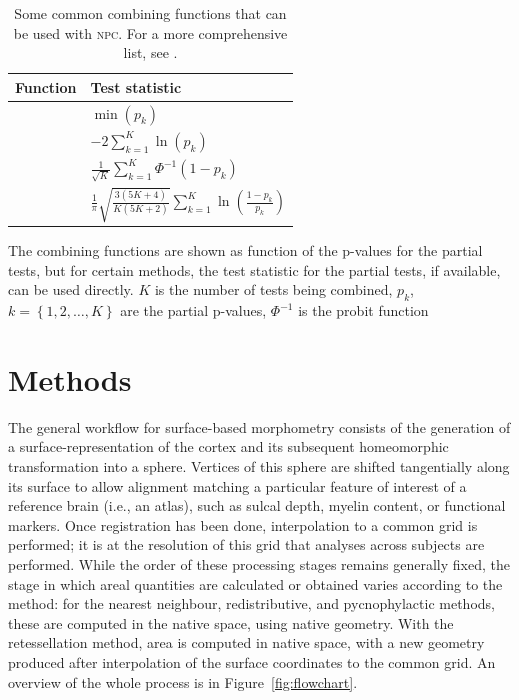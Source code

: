 \begin{table}[!tp]
\caption[Some combining functions that can be used with \textsc{npc}.]{Some common combining functions that can be used with \textsc{npc}. For a more comprehensive list, see \citet{Winkler2016_npc}.}
\begin{center}
\hspace*{-0mm}\begin{tabular}{@{}ll@{}}
\toprule
Function & Test statistic\\
\midrule
\citet{Tippett1931} & $\min \left(p_{k}\right)$ \\[6pt]
\citet{Fisher1932} & $-2 \sum_{k=1}^{K} \ln\left(p_{k}\right)$ \\[6pt]
\citet{Stouffer1949} & $\frac{1}{\sqrt{K}} \sum_{k=1}^{K} \Phi^{-1}\left(1-p_{k}\right)$ \\[6pt]
\citet{Mudholkar1979} & $\frac{1}{\pi}\sqrt{\frac{3(5K+4)}{K(5K+2)}}\sum_{k=1}^{K} \ln\left(\frac{1-p_{k}}{p_{k}}\right)$\\[3pt]
\bottomrule   
\end{tabular}
\end{center}
{\footnotesize
The combining functions are shown as function of the p-values for the partial tests, but for certain methods, the test statistic for the partial tests, if available, can be used directly.
$K$ is the number of tests being combined,
$p_{k}$, $k=\left\{1,2,\ldots,K\right\}$ are the partial p-values,
$\Phi^{-1}$ is the probit function\par}
\label{tab:combining_functions}
\end{table}

\section{Methods}
\label{sec:cortex:methods}

The general workflow for surface-based morphometry consists of the generation of a surface-representation of the cortex and its subsequent homeomorphic transformation into a sphere. Vertices of this sphere are shifted tangentially along its surface to allow alignment matching a particular feature of interest of a reference brain (i.e., an atlas), such as sulcal depth, myelin content, or functional markers. Once registration has been done, interpolation to a common grid is performed; it is at the resolution of this grid that analyses across subjects are performed. While the order of these processing stages remains generally fixed, the stage in which areal quantities are calculated or obtained varies according to the method: for the nearest neighbour, redistributive, and pycnophylactic methods, these are computed in the native space, using native geometry. With the retessellation method, area is computed in native space, with a new geometry produced after interpolation of the surface coordinates to the common grid. An overview of the whole process is in Figure~\ref{fig:flowchart}.

